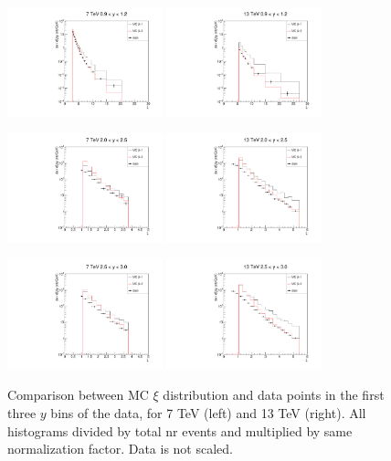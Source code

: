 \documentclass{article}
\begin{document}
\clearpage

\begin{figure}[h!]
\centering
\includegraphics[width = 0.4\textwidth]{xi_7_y4.pdf}
\includegraphics[width = 0.4\textwidth]{xi_13_y4.pdf}

\includegraphics[width = 0.4\textwidth]{xi_7_y5.pdf}
\includegraphics[width = 0.4\textwidth]{xi_13_y5.pdf}

\includegraphics[width = 0.4\textwidth]{xi_7_y6.pdf}
\includegraphics[width = 0.4\textwidth]{xi_13_y6.pdf}
\caption{Comparison between MC $\xi$ distribution and data points in the first three $y$ bins of the data, for 7 TeV (left) and 13 TeV (right). All histograms divided by total nr events and multiplied by same normalization factor. Data is not scaled.}\label{f:xi_comp_2}
\end{figure}
\end{document}

